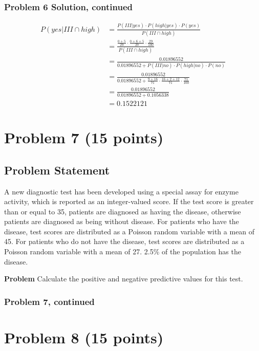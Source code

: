 \documentclass[12pt]{article}
\theoremstyle{definition}
\begin{document}
\subsubsection*{Problem 6 Solution, continued}
\begin{align*}
P(yes|III \cap high) &= \frac{P(III|yes) \cdot P(high|yes) \cdot P(yes)}{P(III \cap high)}\\
&= \frac{\frac{0 + 5}{29} \cdot \frac{0 + 6 + 5}{29} \cdot \frac{29}{100}}{P(III \cap high)}\\
&= \frac{0.01896552}{0.01896552 + P(III|no) \cdot P(high|no) \cdot P(no)}\\
&= \frac{0.01896552}{0.01896552 + \frac{9 + 16}{71} \cdot \frac{16 + 2 + 12}{71} \cdot \frac{71}{100}}\\
&= \frac{0.01896552}{0.01896552+ 0.1056338}\\
&= 0.1522121
\end{align*}







\newpage
\section*{Problem 7 (15 points)}

\subsection*{Problem Statement}

A new diagnostic test has been developed using a special assay for enzyme activity, which is reported as an integer-valued score. If the test score is greater than or equal to 35, patients are diagnosed as having the disease, otherwise patients are diagnosed as being without disease. For patients who have the disease, test scores are distributed as a Poisson random variable with a mean of 45. For patients who do not have the disease, test scores are distributed as a Poisson random variable with a mean of 27. 2.5\% of the population has the disease.

\bigskip
\noindent
{\bf Problem} Calculate the positive and negative predictive values for this test.


\newpage
\subsubsection*{Problem 7, continued}


\newpage
\section*{Problem 8 (15 points)}
\end{document}
